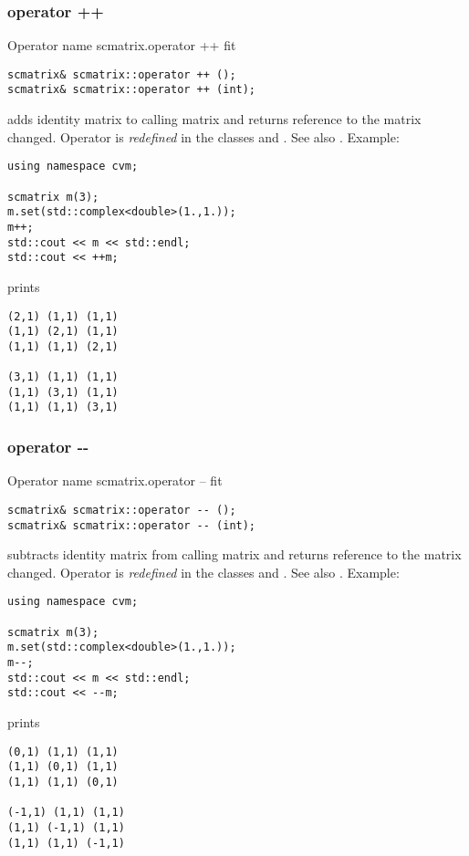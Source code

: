 \subsubsection{operator ++}
Operator%
\pdfdest name {scmatrix.operator ++} fit
\begin{verbatim}
scmatrix& scmatrix::operator ++ ();
scmatrix& scmatrix::operator ++ (int);
\end{verbatim}
adds identity matrix to  calling matrix
and returns  reference to
the matrix changed.
Operator is \emph{redefined} in the classes
 and .
See also .
Example:
\begin{Verbatim}
using namespace cvm;

scmatrix m(3);
m.set(std::complex<double>(1.,1.));
m++;
std::cout << m << std::endl;
std::cout << ++m;
\end{Verbatim}
prints
\begin{Verbatim}
(2,1) (1,1) (1,1)
(1,1) (2,1) (1,1)
(1,1) (1,1) (2,1)

(3,1) (1,1) (1,1)
(1,1) (3,1) (1,1)
(1,1) (1,1) (3,1)
\end{Verbatim}
\newpage



\subsubsection{operator -{}-}
Operator%
\pdfdest name {scmatrix.operator --} fit
\begin{verbatim}
scmatrix& scmatrix::operator -- ();
scmatrix& scmatrix::operator -- (int);
\end{verbatim}
subtracts identity matrix from  calling matrix
and returns  reference to
the matrix changed.
Operator is \emph{redefined} in the classes
 and .
See also .
Example:
\begin{Verbatim}
using namespace cvm;

scmatrix m(3);
m.set(std::complex<double>(1.,1.));
m--;
std::cout << m << std::endl;
std::cout << --m;
\end{Verbatim}
prints
\begin{Verbatim}
(0,1) (1,1) (1,1)
(1,1) (0,1) (1,1)
(1,1) (1,1) (0,1)

(-1,1) (1,1) (1,1)
(1,1) (-1,1) (1,1)
(1,1) (1,1) (-1,1)
\end{Verbatim}
\newpage



